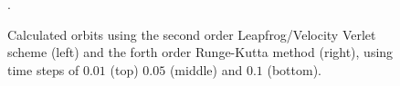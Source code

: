 \documentclass{article}
\begin{document}
\begin{figure}[h!]
    \qquad
    \qquad
    \caption[]{Calculated orbits using the second order Leapfrog/Velocity Verlet
    scheme (left) and the forth order Runge-Kutta method (right), using time
    steps of $0.01$ (top) $0.05$ (middle) and $0.1$ (bottom).}.
\end{figure}
\end{document}
